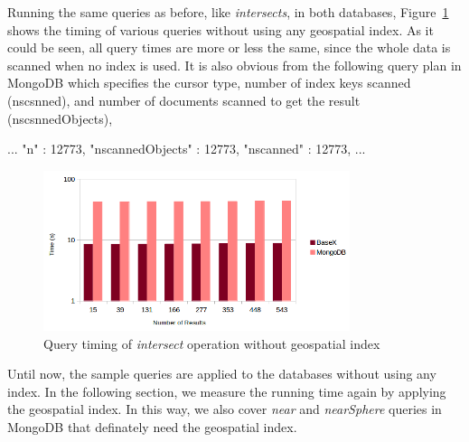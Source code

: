 \documentclass[a4paper,12pt]{article}
\begin{document}

Running the same queries as before, like \textit{intersects}, in both databases, Figure~\ref{figBXvsMongoNoIndexIntersects} shows the timing of various queries without using any geospatial index. As it could be seen, all query times are more or less the same, since the whole data is scanned when no index is used. It is also obvious from the following query plan in MongoDB which specifies the cursor type, number of index keys scanned (nscsnned), and number of documents scanned to get the result (nscsnnedObjects),
\begin{fakeJSON}
...
"n" : 12773,
"nscannedObjects" : 12773,
"nscanned" : 12773,
...
\end{fakeJSON}

\begin{figure}
\centering
\includegraphics[width=0.8\textwidth,height=0.25\textheight]{BXvsMongo-NoIndex-Intersects-Sec-log}
\caption{Query timing of \textit{intersect} operation without geospatial index}
\label{figBXvsMongoNoIndexIntersects}
\end{figure}


Until now, the sample queries are applied to the databases without using any index. 
In the following section, we measure the running time again by applying the geospatial index.
In this way, we also cover \textit{near} and \textit{nearSphere} queries in MongoDB that definately need the geospatial index.  


\end{document}
